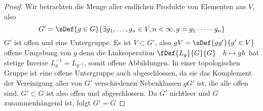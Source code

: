 \begin{proof}
	Wir betrachten die Menge aller endlichen Produkte von Elementen aus $V$, also 
	\begin{equation}
		G' = \sDef{g\in G}{\exists g_1,\dots,g_n\in V, n < \infty, g = g_1\cdot\dots\cdot g_n}
	\end{equation}
	$G'$ ist offen und eine Untergruppe. Es ist $V\subset G'$, also $gV = \sDef{gg'}{g'\in V}$ offene Umgebung von $g$ denn die Linksoperation $\fDef{L_g}{G}{G} \quad h \mapsto gh$ hat stetige Inverse $L_{g}^{-1} = L_{g^{-1}}$, somit offene Abbildungen. In einer topologischen Gruppe ist eine offene Untergruppe auch abgeschlossen, da sie das Komplement der Vereinigung aller von $G'$ verschiedenen Nebenklassen $gG'$ ist, die alle offen sind. $G' \subset G$ ist also offen und abgeschlossen. Da $G'$ nichtleer und $G$ zusammenhängend ist, folgt $G' = G$
\end{proof}